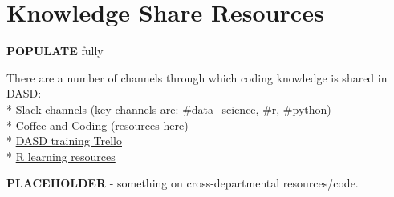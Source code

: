 \documentclass[]{book}
\begin{document}
\hypertarget{ksresources}{%
\chapter{Knowledge Share Resources}\label{ksresources}}

\textbf{POPULATE} fully

There are a number of channels through which coding knowledge is shared in DASD:\\
* Slack channels (key channels are: \href{https://app.slack.com/client/T1PU1AP6D/C1Z8Q18LS}{\#data\_science}, \href{https://app.slack.com/client/T1PU1AP6D/C1PUCG719}{\#r}, \href{https://app.slack.com/client/T1PU1AP6D/C1Q09V86S}{\#python})\\
* Coffee and Coding (resources \href{https://github.com/moj-analytical-services/Coffee-and-Coding}{here})\\
* \href{https://trello.com/b/zAwm6sCc/dasd-training}{DASD training Trello}\\
* \href{https://docs.google.com/document/d/1R4hBMf26T9HEnCdVz56PpZhwiCv5RhberYL3BxOSKsA/edit}{R learning resources}

\textbf{PLACEHOLDER} - something on cross-departmental resources/code.
\end{document}
